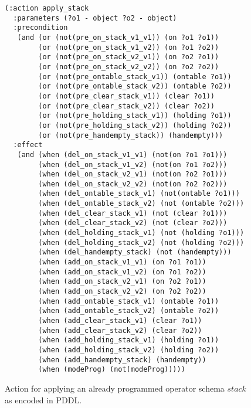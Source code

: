 \documentclass[letterpaper]{article} %
\begin{document}
\begin{figure}[hbt]
\begin{tiny}
\begin{verbatim}
(:action apply_stack
  :parameters (?o1 - object ?o2 - object)
  :precondition
   (and (or (not(pre_on_stack_v1_v1)) (on ?o1 ?o1))
        (or (not(pre_on_stack_v1_v2)) (on ?o1 ?o2))
        (or (not(pre_on_stack_v2_v1)) (on ?o2 ?o1))
        (or (not(pre_on_stack_v2_v2)) (on ?o2 ?o2))
        (or (not(pre_ontable_stack_v1)) (ontable ?o1))
        (or (not(pre_ontable_stack_v2)) (ontable ?o2))
        (or (not(pre_clear_stack_v1)) (clear ?o1))
        (or (not(pre_clear_stack_v2)) (clear ?o2))
        (or (not(pre_holding_stack_v1)) (holding ?o1))
        (or (not(pre_holding_stack_v2)) (holding ?o2))
        (or (not(pre_handempty_stack)) (handempty)))
  :effect
   (and (when (del_on_stack_v1_v1) (not(on ?o1 ?o1)))
        (when (del_on_stack_v1_v2) (not(on ?o1 ?o2)))
        (when (del_on_stack_v2_v1) (not(on ?o2 ?o1)))
        (when (del_on_stack_v2_v2) (not(on ?o2 ?o2)))
        (when (del_ontable_stack_v1) (not(ontable ?o1)))
        (when (del_ontable_stack_v2) (not (ontable ?o2)))
        (when (del_clear_stack_v1) (not (clear ?o1)))
        (when (del_clear_stack_v2) (not (clear ?o2)))
        (when (del_holding_stack_v1) (not (holding ?o1)))
        (when (del_holding_stack_v2) (not (holding ?o2)))
        (when (del_handempty_stack) (not (handempty)))
        (when (add_on_stack_v1_v1) (on ?o1 ?o1))
        (when (add_on_stack_v1_v2) (on ?o1 ?o2))
        (when (add_on_stack_v2_v1) (on ?o2 ?o1))
        (when (add_on_stack_v2_v2) (on ?o2 ?o2))
        (when (add_ontable_stack_v1) (ontable ?o1))
        (when (add_ontable_stack_v2) (ontable ?o2))
        (when (add_clear_stack_v1) (clear ?o1))
        (when (add_clear_stack_v2) (clear ?o2))
        (when (add_holding_stack_v1) (holding ?o1))
        (when (add_holding_stack_v2) (holding ?o2))
        (when (add_handempty_stack) (handempty))
        (when (modeProg) (not(modeProg)))))
\end{verbatim}
\end{tiny}
 \caption{\small Action for applying an already programmed operator schema $stack$ as encoded in PDDL.}
\label{fig:compilation}
\end{figure}
\end{document}
